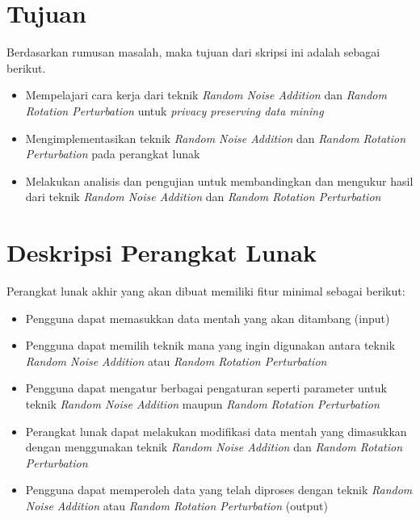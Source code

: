 \documentclass[a4paper,twoside]{article}
\begin{document}
\section{Tujuan}
Berdasarkan rumusan masalah, maka tujuan dari skripsi ini adalah sebagai berikut.
\begin{itemize}
	\item Mempelajari cara kerja dari teknik \textit{Random Noise Addition} dan \textit{Random Rotation Perturbation} untuk \textit{privacy preserving data mining}
	\item Mengimplementasikan teknik \textit{Random Noise Addition} dan \textit{Random Rotation Perturbation} pada perangkat lunak
	\item Melakukan analisis dan pengujian untuk membandingkan dan mengukur hasil dari teknik \textit{Random Noise Addition} dan \textit{Random Rotation Perturbation}
\end{itemize}

\section{Deskripsi Perangkat Lunak}
Perangkat lunak akhir yang akan dibuat memiliki fitur minimal sebagai berikut:
\begin{itemize}
	\item Pengguna dapat memasukkan data mentah yang akan ditambang (input)
	\item Pengguna dapat memilih teknik mana yang ingin digunakan antara teknik \textit{Random Noise Addition} atau \textit{Random Rotation Perturbation}
	\item Pengguna dapat mengatur berbagai pengaturan seperti parameter untuk teknik \textit{Random Noise Addition} maupun \textit{Random Rotation Perturbation}
	\item Perangkat lunak dapat melakukan modifikasi data mentah yang dimasukkan dengan menggunakan teknik \textit{Random Noise Addition} dan \textit{Random Rotation Perturbation}
	\item Pengguna dapat memperoleh data yang telah diproses dengan teknik \textit{Random Noise Addition} atau \textit{Random Rotation Perturbation} (output)
\end{itemize}
\end{document}

